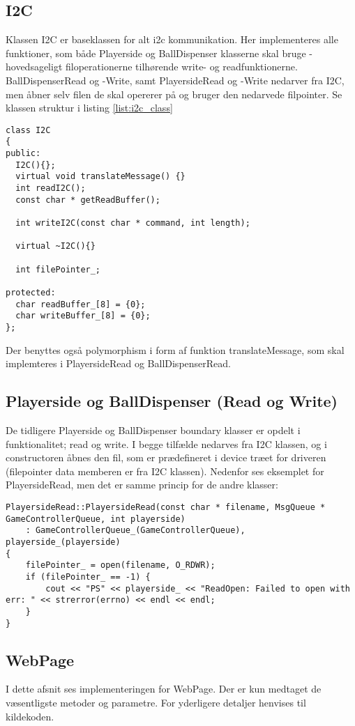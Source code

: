 \documentclass[Softwaredesign/Softwaredesign_main.tex]{subfiles}
\begin{document}
\subsection{I2C}
Klassen I2C er baseklassen for alt i2c kommunikation. Her implementeres alle funktioner, som både Playerside og BallDispenser klasserne skal bruge - hovedsageligt filoperationerne tilhørende write- og readfunktionerne. BallDispenserRead og -Write, samt PlayersideRead og -Write nedarver fra I2C, men åbner selv filen de skal opererer på og bruger den nedarvede filpointer. Se klassen struktur i listing \ref{list:i2c_class}
\begin{lstlisting}[caption={I2C headerfil}, label=list:i2c_class]
class I2C
{
public:
  I2C(){};
  virtual void translateMessage() {}
  int readI2C();
  const char * getReadBuffer();

  int writeI2C(const char * command, int length);

  virtual ~I2C(){}

  int filePointer_;

protected:
  char readBuffer_[8] = {0};
  char writeBuffer_[8] = {0};
};
\end{lstlisting}
Der benyttes også polymorphism i form af funktion translateMessage, som skal implemteres i PlayersideRead og BallDispenserRead. 

\subsection{Playerside og BallDispenser (Read og Write)}
De tidligere Playerside og BallDispenser boundary klasser er opdelt i funktionalitet; read og write. I begge tilfælde nedarves fra I2C klassen, og i constructoren åbnes den fil, som er prædefineret i device træet for driveren (filepointer data memberen er fra I2C klassen). Nedenfor ses eksemplet for PlayersideRead, men det er samme princip for de andre klasser: 
\begin{lstlisting}[caption={PlayersideRead constructor}, label=list:construct]
PlayersideRead::PlayersideRead(const char * filename, MsgQueue * GameControllerQueue, int playerside)
	: GameControllerQueue_(GameControllerQueue), playerside_(playerside)
{
	filePointer_ = open(filename, O_RDWR);
	if (filePointer_ == -1) {
		cout << "PS" << playerside_ << "ReadOpen: Failed to open with err: " << strerror(errno) << endl << endl;
	}
}
\end{lstlisting}

\subsection{WebPage}\label{sec:webpage_implementering}
I dette afsnit ses implementeringen for WebPage. Der er kun medtaget de væsentligste metoder og parametre. For yderligere detaljer henvises til kildekoden. 
\end{document}
